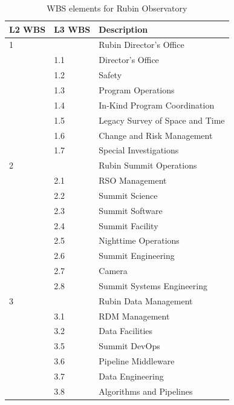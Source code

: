 \begin{longtable}[]{@{}lll@{}}
\caption{WBS elements for Rubin Observatory} \label{tab:wbs}\\

\hline
L2 \gls{WBS} & L3 \gls{WBS} & Description \tabularnewline
\hline
\endhead

1 & & Rubin \gls{Director}'s Office  \tabularnewline
  & 1.1 & \hspace{0.5cm} \gls{Director}'s Office  \tabularnewline
  & 1.2 & \hspace{0.5cm} \gls{Safety}  \tabularnewline
  & 1.3 & \hspace{0.5cm} Program \gls{Operations}\footnotemark[1]  \tabularnewline
  & 1.4 & \hspace{0.5cm} In-Kind Program Coordination  \tabularnewline
  & 1.5 & \hspace{0.5cm} Legacy Survey of Space and Time  \tabularnewline
  & 1.6 & \hspace{0.5cm} Change and Risk Management  \tabularnewline
  & 1.7 & \hspace{0.5cm} Special Investigations  \tabularnewline
2 & & Rubin Summit \gls{Operations}  \tabularnewline
  & 2.1 & \hspace{0.5cm} \gls{RSO} Management  \tabularnewline
  & 2.2 & \hspace{0.5cm} Summit Science  \tabularnewline
  & 2.3 & \hspace{0.5cm} Summit Software  \tabularnewline
  & 2.4 & \hspace{0.5cm} Summit Facility  \tabularnewline
  & 2.5 & \hspace{0.5cm} Nighttime \gls{Operations}  \tabularnewline
  & 2.6 & \hspace{0.5cm} Summit Engineering  \tabularnewline
  & 2.7 & \hspace{0.5cm} Camera  \tabularnewline
  & 2.8 & \hspace{0.5cm} Summit Systems Engineering  \tabularnewline
3 & & Rubin Data Management \tabularnewline
  & 3.1 & \hspace{0.5cm} \gls{RDM} Management  \tabularnewline
  & 3.2 & \hspace{0.5cm} Data Facilities  \tabularnewline
  & 3.5 & \hspace{0.5cm} Summit DevOps  \tabularnewline
  & 3.6 & \hspace{0.5cm} Pipeline Middleware  \tabularnewline
  & 3.7 & \hspace{0.5cm} Data Engineering  \tabularnewline
  & 3.8 & \hspace{0.5cm} Algorithms and Pipelines  \tabularnewline

\end{longtable}
